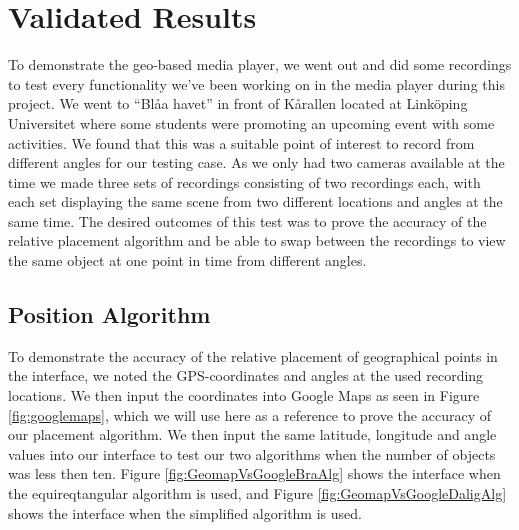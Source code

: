 \chapter{Validated Results}
\label{cha:results}

To demonstrate the geo-based media player, we went out and did some recordings to test every functionality we’ve been working on in the media player during this project. We went to “Blåa havet” in front of Kårallen located at Linköping Universitet where some students were promoting an upcoming event with some activities. We found that this was a suitable point of interest to record from different angles for our testing case. As we only had two cameras available at the time we made three sets of recordings consisting of two recordings each, with each set displaying the same scene from two different locations and angles at the same time. The desired outcomes of this test was to prove the accuracy of the relative placement algorithm and be able to swap between the recordings to view the same object at one point in time from different angles.

\section{Position Algorithm}
\label{sec:positionalgorithm}

To demonstrate the accuracy of the relative placement of geographical points in the interface, we noted the GPS-coordinates and angles at the used recording locations. We then input the coordinates into Google Maps as seen in Figure \ref{fig:googlemaps}, which we will use here as a reference to prove the accuracy of our placement algorithm. We then input the same latitude, longitude and angle values into our interface to test our two algorithms when the number of objects was less then ten. Figure \ref{fig:GeomapVsGoogleBraAlg} shows the interface when the equireqtangular algorithm is used, and Figure \ref{fig:GeomapVsGoogleDaligAlg} shows the interface when the simplified algorithm is used. 


